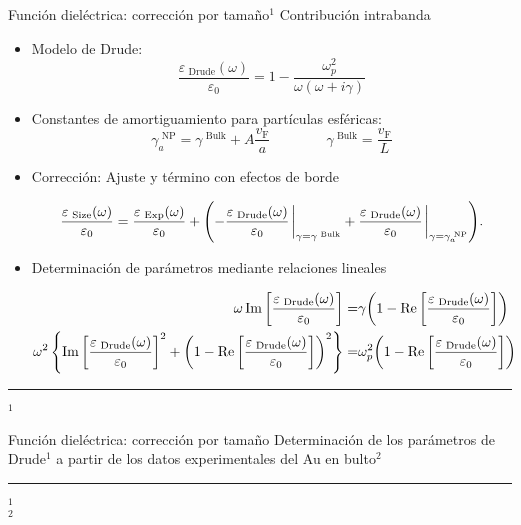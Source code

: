 \begin{frame}{Función dieléctrica: corrección por tamaño$^1$}
{Contribución intrabanda}\small
\begin{itemize}
\item Modelo de Drude:
$$\frac{\varepsilon_\text{ Drude}(\omega)}{\varepsilon_0} = 1 - \frac{\omega_p^2}{\omega(\omega + i \gamma)} $$
\item Constantes de amortiguamiento para partículas esféricas:
$$ 
\gamma^\text{   NP}_a =  \gamma^\text{  Bulk} + A\frac{v_\text{F}}{a}
\qquad\qquad
\gamma^\text{   Bulk} = \frac{v_\text{F}}{L}
$$
\item Corrección: Ajuste y término con efectos de borde

\begin{align*}
\frac{\varepsilon_\text{  Size}(\omega)}{\varepsilon_0} =
	\frac{\varepsilon_\text{  Exp}(\omega)}{\varepsilon_0} +
 \qty(-
	 \frac{\varepsilon_\text{  Drude}(\omega)}{\varepsilon_0}
	 									\eval_{\gamma = \gamma^\text{   Bulk}}
	 +
	 \frac{\varepsilon_\text{  Drude}(\omega)}{\varepsilon_0}
 										\eval_{\gamma = \gamma^\text{   NP}_a} 	).
\end{align*}
\item Determinación de parámetros mediante relaciones lineales

\begin{align*}
\omega \Im\qty[\frac{\varepsilon_\text{  Drude}(\omega)}{\varepsilon_0}] =&
 \gamma \qty(1 - \Re\qty[\frac{\varepsilon_\text{  Drude}(\omega)}{\varepsilon_0}])\\
\omega^2\left\{ \Im\qty[\frac{\varepsilon_\text{  Drude}(\omega)}{\varepsilon_0}]^2
			+ \qty(1-\Re\qty[\frac{\varepsilon_\text{  Drude}(\omega)}{\varepsilon_0}])^2 \right\}
 =& \omega_p^2 \qty(1 - \Re\qty[\frac{\varepsilon_\text{  Drude}(\omega)}{\varepsilon_0}])
\end{align*}
\end{itemize}
%
	\noindent\rule{.25\textwidth}{0.4pt}
 \begin{spacing}{0}\fontsize{4}{12} \selectfont
	$^1$ 
	\end{spacing}
\end{frame}

\begin{frame}{Función dieléctrica: corrección por tamaño}
{Determinación de los parámetros de Drude$^1$ a partir de los datos experimentales del Au en bulto$^2$}\small
 \begin{figure} \centering
\def\svgwidth{.7\textwidth}
\end{figure}

	\noindent\rule{.25\textwidth}{0.4pt}
 \begin{spacing}{0}\fontsize{4}{12} \selectfont
	$^1$ \\
	$^2$ 
	\end{spacing}
\end{frame}

